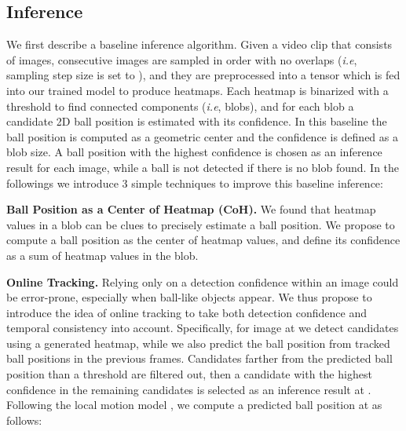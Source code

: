 \documentclass{bmvc2k}
\def\ie{\emph{i.e}\bmvaOneDot}
\begin{document}
\subsection{Inference}
\label{sec:method:infer}
We first describe a baseline inference algorithm.
Given a video clip that consists of  images,  consecutive images are sampled in order with no overlaps (\ie, sampling step size is set to ), and they are preprocessed into a tensor which is fed into our trained model to produce  heatmaps.
Each heatmap is binarized with a threshold  to find connected components (\ie, blobs), and for each blob a candidate 2D ball position is estimated with its confidence.
In this baseline the ball position is computed as a geometric center and the confidence is defined as a blob size.
A ball position with the highest confidence is chosen as an inference result for each image,
while a ball is not detected if there is no blob found.
In the followings we introduce 3 simple techniques to improve this baseline inference:
\par
\vspace{1mm}
\noindent \textbf{Ball Position as a Center of Heatmap (CoH).}
We found that heatmap values in a blob can be clues to precisely estimate a ball position.
We propose to compute a ball position as the center of heatmap values, and define its confidence as a sum of heatmap values in the blob.
\par
\vspace{1mm}
\noindent \textbf{Online Tracking.}
Relying only on a detection confidence within an image could be error-prone, especially when ball-like objects appear.
We thus propose to introduce the idea of online tracking to take both detection confidence and temporal consistency into account.
Specifically, for image at  we detect candidates using a generated heatmap, while we also predict the ball position from tracked ball positions in the previous frames.
Candidates farther from the predicted ball position than a threshold are filtered out, then a candidate with the highest confidence in the remaining candidates is selected as an inference result at .
Following the local motion model \cite{zhou+2013icassp,zhou+2015tmm}, we compute a predicted ball position  at  as follows:
\end{document}
